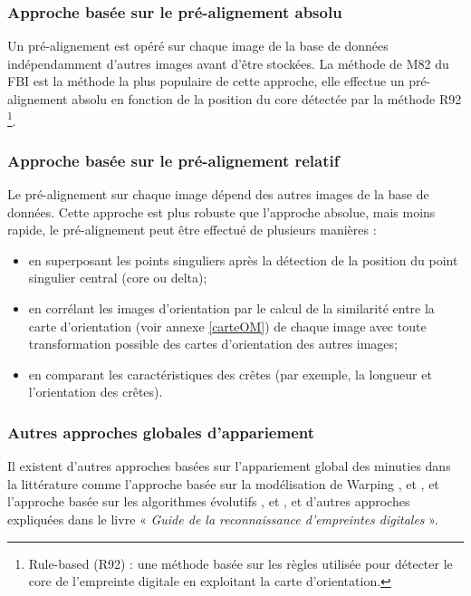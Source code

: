 \subsubsection{Approche basée sur le pré-alignement absolu}
Un pré-alignement est opéré sur chaque image de la base de données indépendamment d'autres images avant d'être stockées. La méthode de M82 du FBI est la méthode la plus populaire de cette approche, elle effectue un pré-alignement absolu en fonction de la position du core détectée par la méthode R92 \footnote{Rule-based (R92) : une méthode basée sur les règles utilisée pour détecter le core de l’empreinte digitale en exploitant la carte d’orientation.}.

\subsubsection{Approche basée sur le pré-alignement relatif}
Le pré-alignement sur chaque image dépend des autres images de la base de données. Cette approche est plus robuste que l'approche absolue, mais moins rapide, le pré-alignement peut être effectué de plusieurs manières :
\begin{itemize}
	\item en superposant les points singuliers après la détection de la position du point singulier central (core ou delta);
	\item en corrélant les images d'orientation par le calcul de la similarité entre la carte d'orientation (voir annexe \ref{carteOM}) de chaque image avec toute transformation possible des cartes d'orientation des autres images;
	\item en comparant les caractéristiques des crêtes (par exemple, la longueur et l'orientation des crêtes).
\end{itemize}
\subsubsection{Autres approches globales d'appariement}
Il existent d'autres approches basées sur l'appariement global des minuties dans la littérature comme l'approche basée sur la modélisation de Warping \citep{meenen2006utilization}, \citep{liang2006fingerprint} et \citep{shi2009minucode}, et l'approche basée sur les algorithmes évolutifs \citep{sheng2009consensus}, \citep{sheng2007memetic} et \citep{tan2006fingerprint}, et d'autres approches expliquées dans le livre « \textit{Guide de la reconnaissance d'empreintes digitales} \citep{maltoni2009handbook}».

